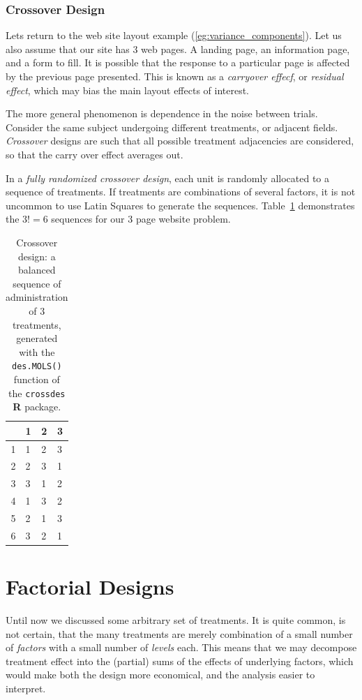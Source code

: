 \documentclass[12pt,a4paper]{report}
\theoremstyle{plain}
\theoremstyle{definition}
\newcommand{\R}{\textnormal{\sffamily\bfseries R }}
\newcommand{\rcode}[1]{\texttt{#1}}
\begin{document}
\subsubsection{Crossover Design}
\label{sec:crossover}
Lets return to the web site layout example (\ref{eg:variance_components}).
Let us also assume that our site has $3$ web pages. A landing page, an information page, and a form to fill. 
It is possible that the response to a particular page is affected by the previous page presented. 
This is known as a \emph{carryover effecf}, or \emph{residual effect}, which may bias the main layout effects of interest. 

The more general phenomenon is dependence in the noise between trials. 
Consider the same subject undergoing different treatments, or adjacent fields. 
\emph{Crossover} designs are such that all possible treatment adjacencies are considered, so that the carry over effect averages out. 

In a \emph{fully randomized crossover design}, each unit is randomly allocated to a sequence of treatments.
If treatments are combinations of several factors, it is not uncommon to use Latin Squares to generate the sequences. Table~\ref{tab:crossover} demonstrates the $3!=6$ sequences for our $3$ page website problem.
\begin{table}[ht]
\centering
\begin{tabular}{rlll}
  \hline
 & 1 & 2 & 3 \\ 
  \hline
1 & 1 & 2 & 3 \\ 
  2 & 2 & 3 & 1 \\ 
  3 & 3 & 1 & 2 \\ 
  4 & 1 & 3 & 2 \\ 
  5 & 2 & 1 & 3 \\ 
  6 & 3 & 2 & 1 \\ 
   \hline
\end{tabular}
\caption[Crossover Design]{Crossover design: a balanced sequence of administration of $3$ treatments, generated with the \rcode{des.MOLS()} function of the \rcode{crossdes} \R package. }
\label{tab:crossover}
\end{table}






\section{Factorial Designs}
Until now we discussed some arbitrary set of treatments.
It is quite common, is not certain, that the many treatments are merely combination of a small number of \emph{factors} with a small number of \emph{levels} each.
This means that we may decompose treatment effect into the (partial) sums of the effects of underlying factors, which would make both the design more economical, and the analysis easier to interpret.
\end{document}

